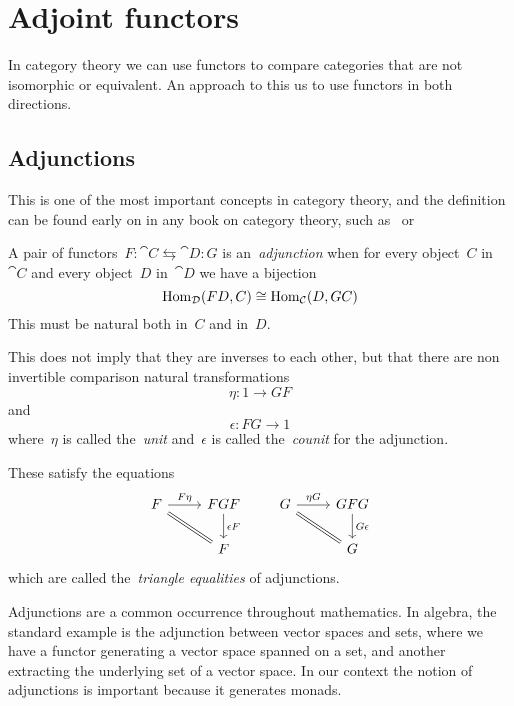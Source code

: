\documentclass[../TFG.tex]{subfiles}
\begin{document}
\section{Adjoint functors}
In category theory we can use functors to compare categories that are not
isomorphic or equivalent. An approach to this us to use functors in both
directions.

\subsection{Adjunctions}

This is one of the most important concepts in category theory, and
the definition can be found early on in any book on category theory,
such as~\cite{Awodey} or~\cite{Leinster}


\begin{definition}[Adjunction]
A pair of functors~\(F:\cat{C}\leftrightarrows\cat{D}:G\) is
an~\emph{adjunction} when for every object~\(C\) in~\(\cat{C}\) and every
object~\(D\) in~\(\cat{D}\) we have a bijection
\[
    \operatorname{Hom}_{\mathcal{D}}(FD, C) \cong \operatorname{Hom}_{\mathcal{C}}(D, GC)
\]
This must be natural both in~\(C\) and in~\(D\).
\end{definition}

This does not imply that they are inverses to each other, but that there are non
invertible comparison natural transformations
\[
    \eta:1\longrightarrow GF
\]
and
\[
    \epsilon:FG\longrightarrow 1
\]
where~\(\eta\) is called the~\emph{unit} and~\(\epsilon\) is
called the~\emph{counit} for the adjunction.

These satisfy the equations
\[
    \begin{tikzcd}
        F \arrow[r, "F\eta", rightarrow] \arrow[dr, equal] & FGF \arrow[d, "\epsilon F", rightarrow] \\
                                                           & F
    \end{tikzcd}
    \qquad
    \begin{tikzcd}
        G \arrow[r, "\eta G", rightarrow] \arrow[dr, equal] & GFG \arrow[d, "G\epsilon", rightarrow] \\
                                                            & G
    \end{tikzcd}
\]
which are called the~\emph{triangle equalities} of adjunctions.

Adjunctions are a common occurrence throughout mathematics. In algebra, the
standard example is the adjunction between vector spaces and sets, where we have
a functor generating a vector space spanned on a set, and another extracting the
underlying set of a vector space. In our context the notion of adjunctions is
important because it generates monads.
\end{document}
